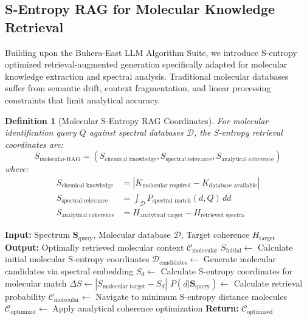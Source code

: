 \documentclass[11pt,a4paper]{article}
\newtheorem{definition}[theorem]{Definition}
\theoremstyle{remark}
\begin{document}
{{{{{{{{{{\subsection{S-Entropy RAG for Molecular Knowledge Retrieval}

Building upon the Buhera-East LLM Algorithm Suite, we introduce S-entropy optimized retrieval-augmented generation specifically adapted for molecular knowledge extraction and spectral analysis. Traditional molecular databases suffer from semantic drift, context fragmentation, and linear processing constraints that limit analytical accuracy.

\begin{definition}[Molecular S-Entropy RAG Coordinates]
For molecular identification query $Q$ against spectral databases $\mathcal{D}$, the S-entropy retrieval coordinates are:
\begin{equation}
S_{\text{molecular-RAG}} = (S_{\text{chemical knowledge}}, S_{\text{spectral relevance}}, S_{\text{analytical coherence}})
\end{equation}
where:
\begin{align}
S_{\text{chemical knowledge}} &= |K_{\text{molecular required}} - K_{\text{database available}}|\\
S_{\text{spectral relevance}} &= \int_{\mathcal{D}} P_{\text{spectral match}}(d, Q) \, dd\\
S_{\text{analytical coherence}} &= H_{\text{analytical target}} - H_{\text{retrieved spectra}}
\end{align}
\end{definition}

\begin{algorithm}[H]
\caption{S-Entropy RAG for Molecular Identification}
\begin{algorithmic}[1]
\State \textbf{Input:} Spectrum $\mathbf{S}_{\text{query}}$, Molecular database $\mathcal{D}$, Target coherence $H_{\text{target}}$
\State \textbf{Output:} Optimally retrieved molecular context $\mathcal{C}_{\text{molecular}}$
\State $S_{\text{initial}} \leftarrow$ Calculate initial molecular S-entropy coordinates
\State $\mathcal{D}_{\text{candidates}} \leftarrow$ Generate molecular candidates via spectral embedding
    \State $S_d \leftarrow$ Calculate S-entropy coordinates for molecular match
    \State $\Delta S \leftarrow |S_{\text{molecular target}} - S_d|$
    \State $P(d|\mathbf{S}_{\text{query}}) \leftarrow$ Calculate retrieval probability
\EndFor
\State $\mathcal{C}_{\text{molecular}} \leftarrow$ Navigate to minimum S-entropy distance molecules
\State $\mathcal{C}_{\text{optimized}} \leftarrow$ Apply analytical coherence optimization
\State \textbf{Return:} $\mathcal{C}_{\text{optimized}}$
\end{algorithmic}
\end{algorithm}

}}}}}}}}}}
\end{document}
